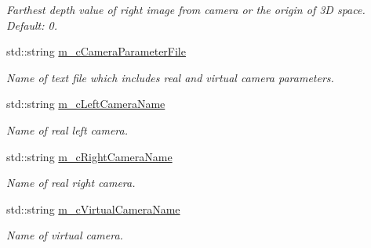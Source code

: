 \begin{DoxyCompactItemize}
\begin{DoxyCompactList}\small\item\em Farthest depth value of right image from camera or the origin of 3D space. Default\+: 0. \end{DoxyCompactList}\item 
\mbox{\label{class_c_parameter_view_interpolation_abab424e85c39bd4efa01d1eec7343352}} 
std\+::string \hyperlink{class_c_parameter_view_interpolation_abab424e85c39bd4efa01d1eec7343352}{m\+\_\+c\+Camera\+Parameter\+File}
\begin{DoxyCompactList}\small\item\em Name of text file which includes real and virtual camera parameters. \end{DoxyCompactList}\item 
\mbox{\label{class_c_parameter_view_interpolation_a6b0f7a7344978e5d0be979c902e63668}} 
std\+::string \hyperlink{class_c_parameter_view_interpolation_a6b0f7a7344978e5d0be979c902e63668}{m\+\_\+c\+Left\+Camera\+Name}
\begin{DoxyCompactList}\small\item\em Name of real left camera. \end{DoxyCompactList}\item 
\mbox{\label{class_c_parameter_view_interpolation_ac0a74a6ba7894dc29335794ad537c911}} 
std\+::string \hyperlink{class_c_parameter_view_interpolation_ac0a74a6ba7894dc29335794ad537c911}{m\+\_\+c\+Right\+Camera\+Name}
\begin{DoxyCompactList}\small\item\em Name of real right camera. \end{DoxyCompactList}\item 
\mbox{\label{class_c_parameter_view_interpolation_a9800dde0381dd49d4b9b60a99ebc4e8b}} 
std\+::string \hyperlink{class_c_parameter_view_interpolation_a9800dde0381dd49d4b9b60a99ebc4e8b}{m\+\_\+c\+Virtual\+Camera\+Name}
\begin{DoxyCompactList}\small\item\em Name of virtual camera. \end{DoxyCompactList}\item 
\mbox{\label{class_c_parameter_view_interpolation_a26f15161fc3eadecd978bcd42d7e38c2}} 

\end{DoxyCompactItemize}
